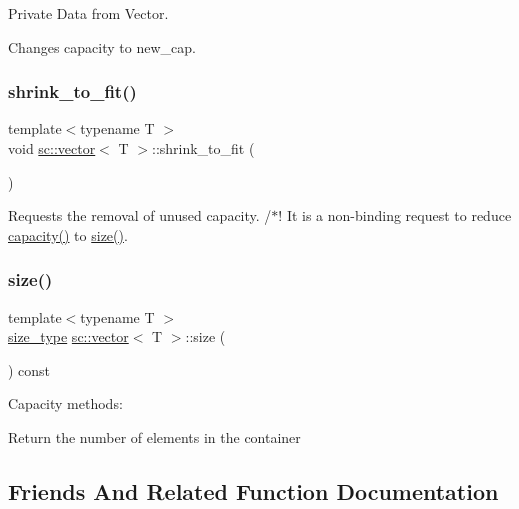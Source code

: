 Private Data from Vector. 

Changes capacity to \textquotesingle{}new\+\_\+cap\textquotesingle{}. \mbox{\label{classsc_1_1vector_aaeb01dacb26f39fb08cffc6f274284fd}} 
\subsubsection{\texorpdfstring{shrink\+\_\+to\+\_\+fit()}{shrink\_to\_fit()}}
{\footnotesize\ttfamily template$<$typename T $>$ \\
void \hyperlink{classsc_1_1vector}{sc\+::vector}$<$ T $>$\+::shrink\+\_\+to\+\_\+fit (\begin{DoxyParamCaption}{ }\end{DoxyParamCaption})\hspace{0.3cm}{\ttfamily [inline]}}

Requests the removal of unused capacity. /$\ast$! It is a non-\/binding request to reduce \hyperlink{classsc_1_1vector_a318c4ab34bd9605214e99db94c4258a9}{capacity()} to \hyperlink{classsc_1_1vector_a1a2113e8d3d4c1494a929d55237d6dde}{size()}. \mbox{\label{classsc_1_1vector_a1a2113e8d3d4c1494a929d55237d6dde}} 
\subsubsection{\texorpdfstring{size()}{size()}}
{\footnotesize\ttfamily template$<$typename T $>$ \\
\hyperlink{classsc_1_1vector_a48bf37ba1a6d0c13504414d86e27c399}{size\+\_\+type} \hyperlink{classsc_1_1vector}{sc\+::vector}$<$ T $>$\+::size (\begin{DoxyParamCaption}{ }\end{DoxyParamCaption}) const\hspace{0.3cm}{\ttfamily [inline]}}



Capacity methods\+: 

Return the number of elements in the container 

\subsection{Friends And Related Function Documentation}
\mbox{\label{classsc_1_1vector_a2c27118e557a04c2dc8d062e1afe730a}} 
